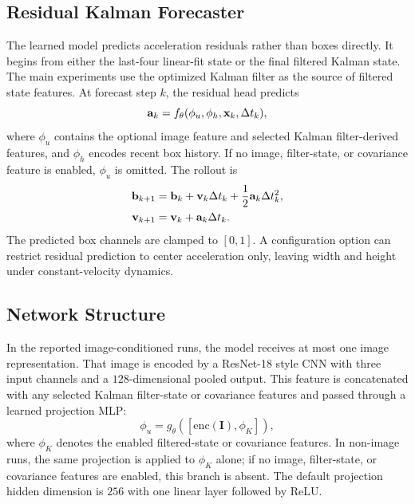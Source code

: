 \subsection{Residual Kalman Forecaster}

The learned model predicts acceleration residuals rather than boxes directly. It begins from either the last-four linear-fit state or the final filtered Kalman state. The main experiments use the optimized Kalman filter as the source of filtered state features. At forecast step $k$, the residual head predicts
\begin{equation}
  \mathbf{a}_k = f_\theta(\phi_u, \phi_h, \mathbf{x}_k, \Delta t_k),
\end{equation}
where $\phi_u$ contains the optional image feature and selected Kalman filter-derived features, and $\phi_h$ encodes recent box history. If no image, filter-state, or covariance feature is enabled, $\phi_u$ is omitted. The rollout is
\begin{align}
  \mathbf{b}_{k+1} &= \mathbf{b}_k + \mathbf{v}_k \Delta t_k
    + \frac{1}{2}\mathbf{a}_k \Delta t_k^2, \\
  \mathbf{v}_{k+1} &= \mathbf{v}_k + \mathbf{a}_k \Delta t_k.
\end{align}
The predicted box channels are clamped to $[0,1]$. A configuration option can restrict residual prediction to center acceleration only, leaving width and height under constant-velocity dynamics.

\subsection{Network Structure}

In the reported image-conditioned runs, the model receives at most one image representation. That image is encoded by a ResNet-18 style CNN with three input channels and a $128$-dimensional pooled output. This feature is concatenated with any selected Kalman filter-state or covariance features and passed through a learned projection MLP:
\begin{equation}
  \phi_u = g_\theta\left([\mathrm{enc}(\mathbf{I}), \phi_K]\right),
\end{equation}
where $\phi_K$ denotes the enabled filtered-state or covariance features. In non-image runs, the same projection is applied to $\phi_K$ alone; if no image, filter-state, or covariance features are enabled, this branch is absent. The default projection hidden dimension is $256$ with one linear layer followed by ReLU.

